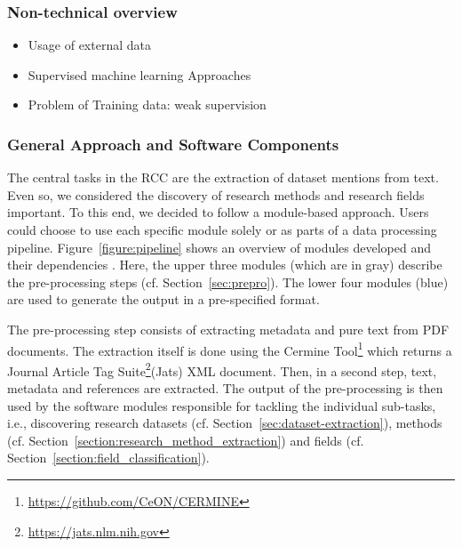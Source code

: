 \subsubsection{Non-technical overview}

\begin{itemize}
    \item Usage of external data
    \item Supervised machine learning Approaches
    \item Problem of Training data: weak supervision
\end{itemize}




\subsubsection{General Approach and Software Components}
The central tasks in the RCC are the extraction of dataset mentions from text. 
Even so, we considered the discovery of research methods and research fields important.
To this end, we decided to follow a module-based approach. Users could choose to use each specific module solely or as parts of a data processing pipeline.
Figure~\ref{figure:pipeline} shows an overview of modules developed  and their dependencies . Here, the upper three modules (which are in gray) describe the pre-processing steps (cf. Section~\ref{sec:prepro}).
The lower four modules (blue) are used to generate the output in a pre-specified format. 

The pre-processing step consists of extracting metadata and pure text from PDF documents. The extraction itself is done using the Cermine Tool\footnote{\url{https://github.com/CeON/CERMINE}} which returns a Journal Article Tag Suite\footnote{\url{https://jats.nlm.nih.gov}}(Jats) XML document. Then, in a second step,
text, metadata and references are extracted. The output of the pre-processing is then used by the software modules responsible for tackling the individual sub-tasks, i.e., discovering research datasets (cf. Section~\ref{sec:dataset-extraction}), methods (cf. Section~\ref{section:research_method_extraction}) and fields (cf. Section~\ref{section:field_classification}).



